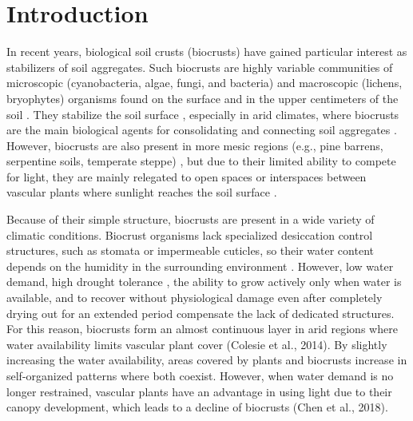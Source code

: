 \section{Introduction}
In recent years, biological soil crusts (biocrusts) have gained particular interest as stabilizers of soil aggregates. Such biocrusts are highly variable communities of microscopic (cyanobacteria, algae, fungi, and bacteria) and macroscopic (lichens, bryophytes) organisms found on the surface and in the upper centimeters of the soil \citep{Gao2017}. They stabilize the soil surface \citep{GarciaPichel2016}, especially in arid climates, where biocrusts are the main biological agents for consolidating and connecting soil aggregates \citep{BelnapBudel2016}. However, biocrusts are also present in more mesic regions (e.g., pine barrens, serpentine soils, temperate steppe) \citep{Belnap2016}, but due to their limited ability to compete for light, they are mainly relegated to open spaces or interspaces between vascular plants where sunlight reaches the soil surface \citep{Issa1999}.

Because of their simple structure, biocrusts are present in a wide variety of climatic conditions. Biocrust organisms lack specialized desiccation control structures, such as stomata or impermeable cuticles, so their water content depends on the humidity in the surrounding environment \citep{Thielen2021}. However, low water demand, high drought tolerance \citep{Chen2020}, the ability to grow actively only when water is available, and to recover without physiological damage even after completely drying out for an extended period \citep{Oliver2005} compensate the lack of dedicated structures. For this reason, biocrusts form an almost continuous layer in arid regions where water availability limits vascular plant cover \citep{Grote2010}(Colesie et al., 2014). By slightly increasing the water availability, areas covered by plants and biocrusts increase in self-organized patterns where both coexist. However, when water demand is no longer restrained, vascular plants have an advantage in using light due to their canopy development, which leads to a decline of biocrusts (Chen et al., 2018).

